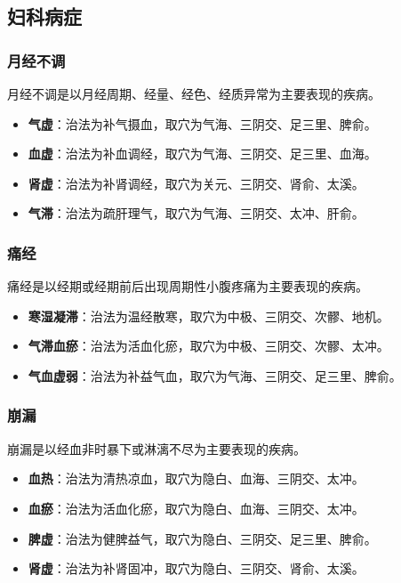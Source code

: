 \documentclass[12pt,UTF8]{ctexbook}
\begin{document}
\subsection{妇科病症}

\subsubsection{月经不调}

月经不调是以月经周期、经量、经色、经质异常为主要表现的疾病。

\begin{itemize}
\item \textbf{气虚}：治法为补气摄血，取穴为气海、三阴交、足三里、脾俞。
\item \textbf{血虚}：治法为补血调经，取穴为气海、三阴交、足三里、血海。
\item \textbf{肾虚}：治法为补肾调经，取穴为关元、三阴交、肾俞、太溪。
\item \textbf{气滞}：治法为疏肝理气，取穴为气海、三阴交、太冲、肝俞。
\end{itemize}

\subsubsection{痛经}

痛经是以经期或经期前后出现周期性小腹疼痛为主要表现的疾病。

\begin{itemize}
\item \textbf{寒湿凝滞}：治法为温经散寒，取穴为中极、三阴交、次髎、地机。
\item \textbf{气滞血瘀}：治法为活血化瘀，取穴为中极、三阴交、次髎、太冲。
\item \textbf{气血虚弱}：治法为补益气血，取穴为气海、三阴交、足三里、脾俞。
\end{itemize}

\subsubsection{崩漏}

崩漏是以经血非时暴下或淋漓不尽为主要表现的疾病。

\begin{itemize}
\item \textbf{血热}：治法为清热凉血，取穴为隐白、血海、三阴交、太冲。
\item \textbf{血瘀}：治法为活血化瘀，取穴为隐白、血海、三阴交、太冲。
\item \textbf{脾虚}：治法为健脾益气，取穴为隐白、三阴交、足三里、脾俞。
\item \textbf{肾虚}：治法为补肾固冲，取穴为隐白、三阴交、肾俞、太溪。
\end{itemize}
\end{document}

